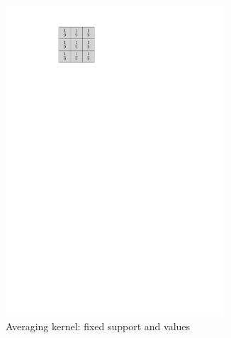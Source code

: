 \begin{figure}[!ht]\centering
\begin{subfigure}[b]{0.20\textwidth}\centering
\includegraphics[width=0.90\textwidth]{figures/kernel-exple.pdf}
\caption{Averaging kernel: fixed support and values}
\end{subfigure}
\begin{subfigure}[b]{0.79\textwidth}\centering

\end{subfigure}
\end{figure}
